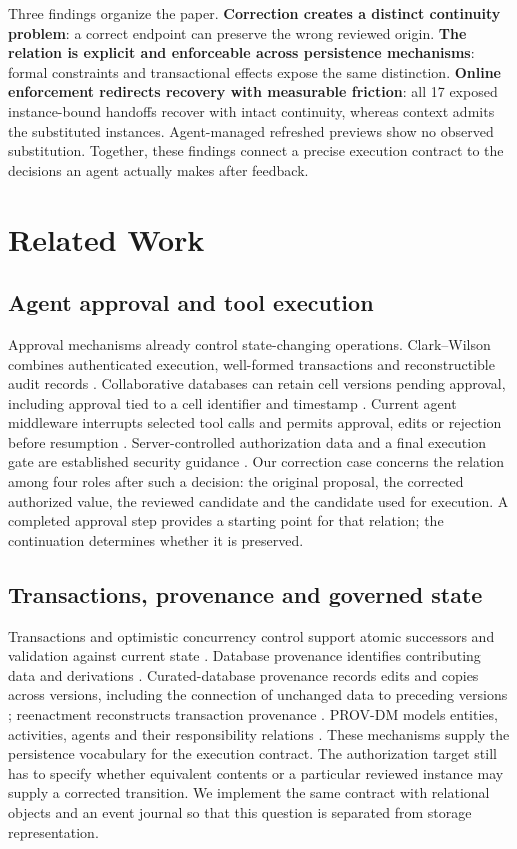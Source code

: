 \documentclass[10pt,a4paper,twocolumn]{article}
\begin{document}
Three findings organize the paper. \textbf{Correction creates a distinct continuity problem}: a correct endpoint can preserve the wrong reviewed origin. \textbf{The relation is explicit and enforceable across persistence mechanisms}: formal constraints and transactional effects expose the same distinction. \textbf{Online enforcement redirects recovery with measurable friction}: all 17 exposed instance-bound handoffs recover with intact continuity, whereas context admits the substituted instances. Agent-managed refreshed previews show no observed substitution. Together, these findings connect a precise execution contract to the decisions an agent actually makes after feedback.

\section{Related Work}
\subsection{Agent approval and tool execution}
Approval mechanisms already control state-changing operations. Clark--Wilson combines authenticated execution, well-formed transactions and reconstructible audit records \citep{clark1987integrity}. Collaborative databases can retain cell versions pending approval, including approval tied to a cell identifier and timestamp \citep{mershad2015approval}. Current agent middleware interrupts selected tool calls and permits approval, edits or rejection before resumption \citep{langchainHITL}. Server-controlled authorization data and a final execution gate are established security guidance \citep{owaspTransactionAuthorization}. Our correction case concerns the relation among four roles after such a decision: the original proposal, the corrected authorized value, the reviewed candidate and the candidate used for execution. A completed approval step provides a starting point for that relation; the continuation determines whether it is preserved.

\subsection{Transactions, provenance and \mbox{governed} state}
Transactions and optimistic concurrency control support atomic successors and validation against current state \citep{gray1981transaction,kung1981occ}. Database provenance identifies contributing data and derivations \citep{buneman2001whywhere,cheney2009provenance}. Curated-database provenance records edits and copies across versions, including the connection of unchanged data to preceding versions \citep{buneman2006curated}; reenactment reconstructs transaction provenance \citep{arab2018reenactment}. PROV-DM models entities, activities, agents and their responsibility relations \citep{moreau2013provdm}. These mechanisms supply the persistence vocabulary for the execution contract. The authorization target still has to specify whether equivalent contents or a particular reviewed instance may supply a corrected transition. We implement the same contract with relational objects and an event journal so that this question is separated from storage representation.
\end{document}
